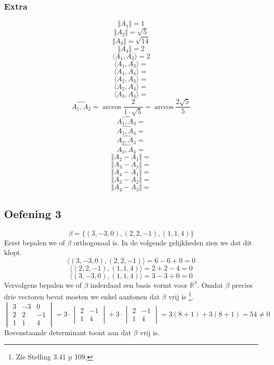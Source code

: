 \documentclass[lineaire_algebra_oplossingen.tex]{subfiles}
\begin{document}
\subsubsection*{Extra}
\[
\Vert A_1 \Vert 
= 1
\]
\[
\Vert A_2 \Vert 
= \sqrt{5}
\]
\[
\Vert A_3 \Vert
= \sqrt{14}
\]
\[
\Vert A_4 \Vert
= 2
\]
\[
\langle A_1,A_2 \rangle
= 2
\]
\[
\langle A_1,A_3 \rangle
=
\]
\[
\langle A_1,A_4 \rangle
=
\]
\[
\langle A_2,A_3 \rangle
=
\]
\[
\langle A_2,A_4 \rangle
=
\]
\[
\langle A_3,A_4 \rangle
=
\]
\[
\widehat{A_1,A_2}
= \arccos\frac{2}{1\cdot \sqrt{5}}
= \arccos\frac{2\sqrt{5}}{5}
\]
\[
\widehat{A_1,A_3}
=
\]
\[
\widehat{A_1,A_4}
=
\]
\[
\widehat{A_2,A_3}
=
\]
\[
\widehat{A_3,A_4}
=
\]
\[
\Vert A_2-A_1 \Vert
=
\]
\[
\Vert A_3-A_1 \Vert
=
\]
\[
\Vert A_4-A_1 \Vert
=
\]
\[
\Vert A_3-A_2 \Vert
=
\]
\[
\Vert A_4-A_3 \Vert
=
\]


\subsection{Oefening 3}
\[
\beta = \{ (3,-3,0),(2,2,-1),(1,1,4) \}
\]
Eerst bepalen we of $\beta$ orthogonaal is.
In de volgende gelijkheden zien we dat dit klopt.
\[
\langle (3,-3,0),(2,2,-1) \rangle = 6-6+0 = 0
\]
\[
\langle (2,2,-1),(1,1,4) \rangle = 2+2-4 = 0
\]
\[
\langle (3,-3,0),(1,1,4) \rangle = 3-3+0 = 0
\]
Vervolgens bepalen we of $\beta$ inderdaad een basis vormt voor $\mathbb{R}^3$.
Omdat $\beta$ precies drie vectoren bevat moeten we enkel aantonen dat $\beta$ vrij is \footnote{Zie Stelling 3.41 p 109.}.
\[
\begin{vmatrix}
3 & -3 & 0\\
2 & 2 & -1\\
1 & 1 & 4
\end{vmatrix}
=
3 \cdot 
\begin{vmatrix}
2 & -1\\
1 & 4
\end{vmatrix}
+ 3 \cdot
\begin{vmatrix}
2 & -1\\
1 & 4
\end{vmatrix}
=
3(8+1)+3(8+1)
=54 \neq 0
\]
Bovenstaande determinant toont aan dat $\beta$ vrij is.
\end{document}
